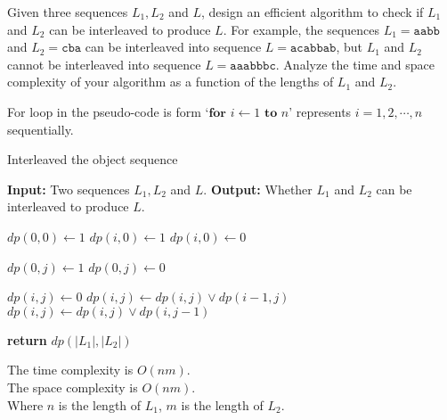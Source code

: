 \problem{}
Given three sequences $L_1, L_2$ and $L$, design an efficient algorithm to check if $L_1$ and $L_2$ can be interleaved to produce $L$.  For example, the sequences $L_1 = \texttt{aabb}$ and $L_2 = \texttt{cba}$ can be interleaved into sequence $L = \texttt{acabbab}$, but $L_1$ and $L_2$ cannot be interleaved into sequence $L = \texttt{aaabbbc}$.  Analyze the time and space complexity of your algorithm as a function of the lengths of $L_1$ and $L_2$.

\solution{}










For loop in the pseudo-code is form `$\textbf{for } i \gets 1 \textbf{ to } n$' represents $i=1,2,\cdots,n$ sequentially.
\begin{algorithm}
    \caption{Interleaved the object sequence}\label{alg:problem-4}
    \begin{algorithmic}[1]
    \State \textbf{Input:} Two sequences $L_1, L_2$ and $L$.
    \State \textbf{Output:} Whether $L_1$ and $L_2$ can be interleaved to produce $L$.
        
    \State $dp(0,0) \gets 1$
            \State $dp(i,0) \gets 1$
        \Else 
            \State $dp(i,0) \gets 0$
        \EndIf
    \EndFor

            \State $dp(0,j) \gets 1$
        \Else 
            \State $dp(0,j) \gets 0$
        \EndIf
    \EndFor
    
            \State $dp(i,j) \gets 0$
                \State $dp(i,j) \gets dp(i,j) \lor dp(i-1,j)$
            \EndIf
                \State $dp(i,j) \gets dp(i,j) \lor dp(i,j-1)$
            \EndIf
        \EndFor
    \EndFor
    
    \State \textbf{return} $dp(|L_1|,|L_2|)$
    \end{algorithmic}
\end{algorithm}

The time complexity is $O(nm)$.\\
The space complexity is $O(nm)$.\\
Where $n$ is the length of $L_1$, $m$ is the length of $L_2$.\\

\newpage